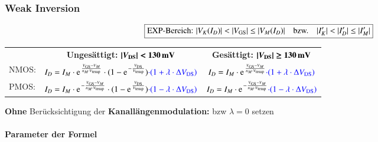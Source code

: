 \subsubsection{Weak Inversion}

\vspace{-0.3cm}

\[ \boxed{ \text{EXP-Bereich: } |V_K(I_D)| < |V_{\rm GS}| \leq |V_M(I_D)| \quad \text{bzw.} \quad |I_K'| < |I_D'| \leq |I_M'| } \] 


\resizebox{\columnwidth}{!}
{
    \renewcommand{\arraystretch}{1.5}
    \begin{tabular}{@{}l c | c@{}}
                & \textbf{Ungesättigt:} \quad $\bm{| V_{\rm DS} | < 130 \, \mathrm{mV}}$                                                                                                  & \textbf{Gesättigt:} \quad $\bm{| V_{\rm DS} | \geq 130 \, \mathrm{mV}}$                                                             \\
        NMOS:   & $I_D = I_M \cdot \e^{\frac{V_{\rm GS} - V_M}{n_M \cdot V_\text{temp}}} \cdot (1 - \e^{-\frac{V_{\rm DS}}{V_\text{temp}}}) \cbl{\cdot (1 + \lambda \cdot \Delta V_{\rm DS})}$  & $I_D = I_M \cdot \e^{\frac{V_{\rm GS} - V_M}{n_M \cdot V_\text{temp}}} \cbl{\cdot (1 + \lambda \cdot \Delta V_{\rm DS})}$     \\
        \midrule
        PMOS:   & $I_D = I_M \cdot \e^{- \frac{V_{\rm GS} - V_M}{n_M \cdot V_\text{temp}}} \cdot (1 - \e^{\frac{V_{\rm DS}}{V_\text{temp}}}) \cbl{\cdot (1 - \lambda \cdot \Delta V_{\rm DS})}$ & $I_D = I_M \cdot \e^{- \frac{V_{\rm GS} - V_M}{n_M \cdot V_\text{temp}}} \cbl{\cdot (1 - \lambda \cdot \Delta V_{\rm DS})}$   \\
    \end{tabular}
    \renewcommand{\arraystretch}{1}
}

\medskip

\textbf{Ohne} Berücksichtigung der \textbf{Kanallängenmodulation:}  bzw $\lambda = 0$ setzen


\paragraph{Parameter der Formel}


